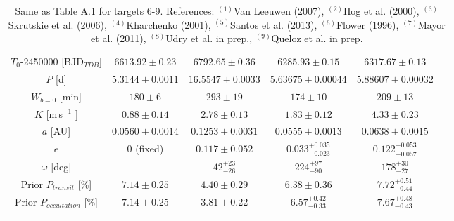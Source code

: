 \documentclass[traditabstract]{aa}
\newcommand{\ms}{\mbox{m\,s$^{-1}$} }
\begin{document}
\begin{appendix}
\begin{table*}
\begin{center}
{\begin{tabular}{cccccc}
$T_{0}$-2450000 [BJD$_{TDB}$]         & $6613.92 \pm 0.23$     & $6792.65 \pm 0.36$        & $6285.93 \pm 0.15$  &  $6317.67 \pm 0.13$   \\ \noalign {\smallskip}     
 $P$ [d]                                   & $5.3144 \pm 0.0011$     & $16.5547 \pm 0.0033$                & $5.63675 \pm 0.00044$                    &  $5.88607 \pm 0.00032$ \\ \noalign {\smallskip} 
$W_{b=0}$ [min]                     & $180 \pm 6$                     & $293 \pm 19$                          & $174 \pm 10$                                  &  $209 \pm 13$ \\ \noalign {\smallskip} 
 $K$ [\ms]                               & $0.88 \pm 0.14$                 & $2.78 \pm 0.13$                     &  $1.83 \pm 0.12$                             &   $4.33 \pm 0.23$    \\ \noalign {\smallskip} 
$a$ [AU]                                 & $0.0560 \pm 0.0014$         & $0.1253 \pm 0.0031$               & $0.0555\pm 0.0013$                      &  $0.0638 \pm 0.0015$ \\ \noalign {\smallskip} 
 $e$                                        & 0 (fixed)                              & $0.117 \pm 0.052$ &$0.033_{-0.023}^{+0.035}$             &  $0.122_{-0.057}^{+0.053}$  \\ \noalign {\smallskip}
 $\omega$ [deg]                     & -                                       & $42_{-26}^{+23}$                      & $224_{-90}^{+97}$                          & $178_{-27}^{+30}$    \\ \noalign {\smallskip} 
Prior $P_{transit}$ [\%]           & $7.14 \pm 0.25 $       & $4.40\pm 0.29$                   & $6.38 \pm 0.36$                              & $7.72_{-0.44}^{+0.51}$ \\ \noalign {\smallskip} 
Prior $P_{occultation}$ [\%]    & $7.14 \pm 0.25$            & $3.81 \pm 0.22$                  & $6.57_{-0.33}^{+0.42}$                   & $7.67_{-0.43}^{+0.48}$   \\ \noalign {\smallskip} 
\hline \noalign {\smallskip} 
\end{tabular}
}
\end{center}
\caption{Same as Table A.1 for targets 6-9. References: $^{(1)}$Van Leeuwen (2007), $^{(2)}$Hog et al. (2000), 
 $^{(3)}$Skrutskie et al. (2006), $^{(4)}$Kharchenko (2001), $^{(5)}$Santos et al. (2013), $^{(6)}$Flower (1996), 
 $^{(7)}$Mayor et al. (2011), $^{(8)}$Udry et al. in prep., $^{(9)}$Queloz et al. in prep.}
\end{table*}


\end{appendix}
\end{document}
